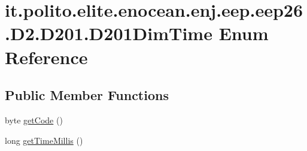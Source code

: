 \hypertarget{enumit_1_1polito_1_1elite_1_1enocean_1_1enj_1_1eep_1_1eep26_1_1_d2_1_1_d201_1_1_d201_dim_time}{}\section{it.\+polito.\+elite.\+enocean.\+enj.\+eep.\+eep26.\+D2.\+D201.\+D201\+Dim\+Time Enum Reference}
\label{enumit_1_1polito_1_1elite_1_1enocean_1_1enj_1_1eep_1_1eep26_1_1_d2_1_1_d201_1_1_d201_dim_time}
\subsection*{Public Member Functions}
\begin{DoxyCompactItemize}
\item 
byte \hyperlink{enumit_1_1polito_1_1elite_1_1enocean_1_1enj_1_1eep_1_1eep26_1_1_d2_1_1_d201_1_1_d201_dim_time_a58e2f1ac00b195baea9d620297035de9}{get\+Code} ()
\item 
long \hyperlink{enumit_1_1polito_1_1elite_1_1enocean_1_1enj_1_1eep_1_1eep26_1_1_d2_1_1_d201_1_1_d201_dim_time_a13499cf7f364b68589148a4fbe06b162}{get\+Time\+Millis} ()
\end{DoxyCompactItemize}
